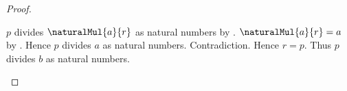 \begin{proof}
\begin{byCase}
\begin{byCase}
                    \begin{byCase}
                            $p$ divides $\naturalMul{a}{r}$
                                as natural numbers
                                by .
                            $\naturalMul{a}{r}=a$ by
                                .
                            Hence $p$ divides $a$ as natural numbers.
                            Contradiction.
                            Hence $r=p$.
                            Thus $p$ divides $b$ as natural numbers.
                    \end{byCase}
            \end{byCase}
    \end{byCase}
\end{proof}
